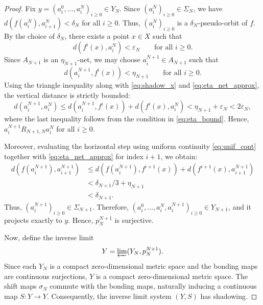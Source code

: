 \documentclass[10pt,a4paper]{amsart}
\numberwithin{equation}{section}
\begin{document}
\begin{proof}
Fix $y = (a_i^0, \dots, a_i^N)_{i\geq 0} \in Y_N$. Since $(a_i^N)_{i\geq 0} \in \Sigma_N$, we have $d(f(a_i^N), a_{i+1}^N) < \delta_N$ for all $i \geq 0$. Thus, $(a_i^N)_{i\geq 0}$ is a $\delta_N$-pseudo-orbit of $f$. By the choice of $\delta_N$, there exists a point $x \in X$ such that
\begin{equation}\label{eq:shadow_x}
        d(f^i(x), a_i^N) < \varepsilon_N
        \qquad\text{for all } i \geq 0.
\end{equation}
Since $A_{N+1}$ is an $\eta_{N+1}$-net, we may choose $a_i^{N+1} \in A_{N+1}$ such that
\begin{equation}\label{eq:eta_net_approx}
        d(a_i^{N+1}, f^i(x)) < \eta_{N+1}
        \qquad\text{for all } i \geq 0.
\end{equation}
Using the triangle inequality along with \eqref{eq:shadow_x} and \eqref{eq:eta_net_approx}, the vertical distance is strictly bounded:
\[
        d(a_i^{N+1}, a_i^N)
        \leq
        d(a_i^{N+1}, f^i(x)) + d(f^i(x), a_i^N)
        <
        \eta_{N+1} + \varepsilon_N
        <
        2\varepsilon_N,
\]
where the last inequality follows from the condition in \eqref{eq:eta_bound}. Hence, $a_i^{N+1} \mathrel{R_{N+1,N}} a_i^N$ for all $i \geq 0$.

Moreover, evaluating the horizontal step using uniform continuity \eqref{eq:unif_cont} together with \eqref{eq:eta_net_approx} for index $i+1$, we obtain:
\[
\begin{aligned}
        d(f(a_i^{N+1}), a_{i+1}^{N+1})
        &\leq
        d(f(a_i^{N+1}), f^{i+1}(x)) + d(f^{i+1}(x), a_{i+1}^{N+1}) \\
        &<
        \delta_{N+1}/3 + \eta_{N+1} \\
        &<
        \delta_{N+1}.
\end{aligned}
\]
Thus, $(a_i^{N+1})_{i\geq 0} \in \Sigma_{N+1}$. Therefore, $(a_i^0, \dots, a_i^N, a_i^{N+1})_{i\geq 0} \in Y_{N+1}$, and it projects exactly to $y$. Hence, $p_N^{N+1}$ is surjective.

Now, define the inverse limit
\[
        Y = \varprojlim (Y_N, p_N^{N+1}).
\]
Since each $Y_N$ is a compact zero-dimensional metric space and the bonding maps are continuous surjections, $Y$ is a compact zero-dimensional metric space. The shift maps $\sigma_N$ commute with the bonding maps, naturally inducing a continuous map $S: Y \to Y$. Consequently, the inverse limit system $(Y,S)$ has shadowing.


\end{proof}
\end{document}
